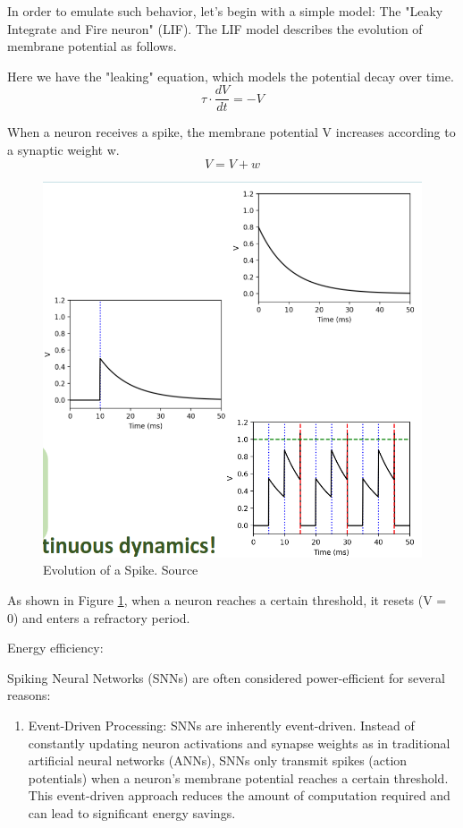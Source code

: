 \begin{frame}[allowframebreaks]
	\par In order to emulate such behavior, let's begin with a simple model: The "Leaky Integrate and Fire neuron" (LIF). The LIF model describes the evolution of membrane potential as follows.
	
	\par Here we have the "leaking" equation, which models the potential decay over time.
	\begin{equation}
		\tau \cdot \dfrac{dV}{dt} = -V
		\label{eq:leak}
	\end{equation}
	
	\par When a neuron receives a spike, the membrane potential V increases according to a synaptic weight w.
	\begin{equation}
		V = V + w
	\end{equation}
	
	\begin{figure}
		\centering
		\includegraphics[width=0.5\linewidth]{images/neuronSpikes2}
		\caption{Evolution of a Spike. Source \cite{dan_goodman_2022_7044500}}
		\label{fig:neuronspikes2}
	\end{figure}
	
	\par As shown in Figure \ref{fig:neuronspikes2}, when a neuron reaches a certain threshold, it resets (V = 0) and enters a refractory period.
	
	\par Energy efficiency:
	
	\par Spiking Neural Networks (SNNs) are often considered power-efficient for several reasons:
	
	\begin{enumerate}
		\item Event-Driven Processing: SNNs are inherently event-driven. Instead of constantly updating neuron activations and synapse weights as in traditional artificial neural networks (ANNs), SNNs only transmit spikes (action potentials) when a neuron's membrane potential reaches a certain threshold. This event-driven approach reduces the amount of computation required and can lead to significant energy savings.
		

\end{enumerate}
\end{frame}
